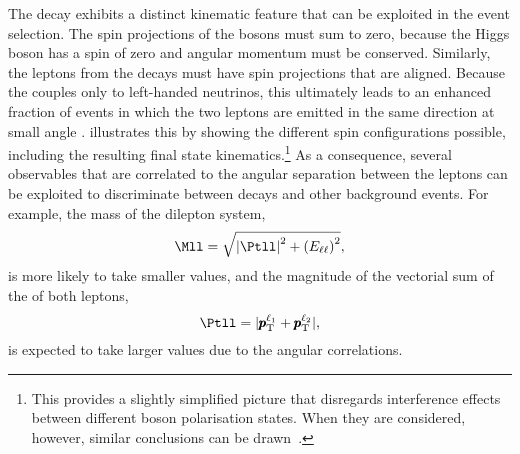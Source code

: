 The \HWWdet decay exhibits a distinct kinematic feature that can be exploited in the event selection.
The spin projections of the \Wboson bosons must sum to zero, because the Higgs boson has a spin of zero and angular momentum must be conserved.
Similarly, the leptons from the \Wboson decays must have spin projections that are aligned. Because the \Wboson couples only to left-handed neutrinos, this ultimately leads to an enhanced fraction of \HWWdet events in which the two leptons are emitted in the same direction at small angle \dphill.
 illustrates this by showing the different spin configurations possible, including the resulting final state kinematics.\footnote{This provides a slightly simplified picture that disregards interference effects between different \Wboson boson polarisation states. When they are considered, however, similar conclusions can be drawn~\cite{Maina_2021}.}
As a consequence, several observables that are correlated to the angular separation between the leptons can be exploited to discriminate between \HWW decays and other background events. For example, the mass of the dilepton system,
\begin{equation}
    \Mll = \sqrt{\left| \Ptll \right|^2+ \left( E_{\ell\ell} \right)^2},
\end{equation}
is more likely to take smaller values, and the magnitude of the vectorial sum of the \pT of both leptons,
\begin{equation}
    \Ptll = |\pmb{p}_\text{T}^{\ell_1} + \pmb{p}_\text{T}^{\ell_2}|,
\end{equation}
is expected to take larger values due to the angular correlations.

